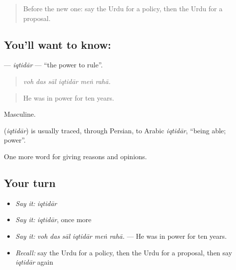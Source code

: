 \label{lesson:UR-C341-iqtidar}



\begin{quote}
Before the new one: say the Urdu for a policy, then the Urdu for a proposal.
\end{quote}

\subsection*{You'll want to know: }
\textbf{} — \emph{iqtidār} — \textquotedblleft{}the power to rule\textquotedblright{}.

\begin{quote}
     
\end{quote}

\begin{quote}
\emph{voh das sāl iqtidār meṅ rahā.}
\end{quote}

\begin{quote}
He was in power for ten years.
\end{quote}

Masculine.

\begin{cousinweb}
\textbf{} (\emph{iqtidār}) is usually traced, through Persian, to Arabic \emph{iqtidār}, \textquotedblleft{}being able; power\textquotedblright{}.
\end{cousinweb}

\begin{grammarlens}[title={What you've built}]
One more word for giving reasons and opinions.
\end{grammarlens}

\subsection*{Your turn}
\begin{itemize}
\raggedright
  \item \emph{Say it:} \emph{iqtidār}
  \item \emph{Say it:} \emph{iqtidār}, once more
  \item \emph{Say it:} \emph{voh das sāl iqtidār meṅ rahā.} — He was in power for ten years.
  \item \emph{Recall:} say the Urdu for a policy, then the Urdu for a proposal, then say \emph{iqtidār} again
\end{itemize}

